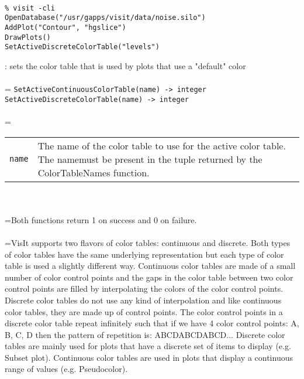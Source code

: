 \documentclass[10pt,a4paper]{report}
\begin{document}
\\[-6mm]
\begin{verbatim}% visit -cli
OpenDatabase("/usr/gapps/visit/data/noise.silo")
AddPlot("Contour", "hgslice")
DrawPlots()
SetActiveDiscreteColorTable("levels")
\end{verbatim}
\newpage


{}
: sets the color table that is used by plots that use a "default" color\\[-3mm]

 \\ 
\hangindent=\parindent 
\verb!SetActiveContinuousColorTable(name) -> integer!\\ 
\verb!SetActiveDiscreteColorTable(name) -> integer!\\ [-3mm]

 \\ 
\hangindent=\parindent 
\begin{tabular}{lp{9cm}}
\verb!name! & The name of the color table to use for the active color table. The namemust be present in the tuple returned by the ColorTableNames function. \\
\end{tabular} \\[-2mm]


 \\ 
\hangindent=\parindent Both functions return 1 on success and 0 on failure. \\[-3mm] 

 \\ 
\hangindent=\parindent VisIt supports two flavors of color tables: continuous and discrete. Both types of color tables have the same underlying representation but each type of color table is used a slightly different way. Continuous color tables are made of a small number of color control points and the gaps in the color table between two color control points are filled by interpolating the colors of the color control points. Discrete color tables do not use any kind of interpolation and like continuous color tables, they are made up of control points. The color control points in a discrete color table repeat infinitely such that if we have 4 color control points: A, B, C, D then the pattern of repetition is: ABCDABCDABCD... Discrete color tables are mainly used for plots that have a discrete set of items to display (e.g. Subset plot). Continuous color tables are used in plots that display a continuous range of values (e.g. Pseudocolor). \\[-3mm] 
\end{document}
